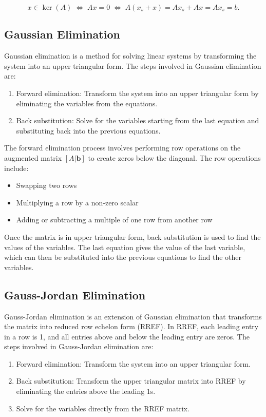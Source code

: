 \[
	x \in \ker(A) \;\Leftrightarrow\; Ax = 0 \;\Leftrightarrow\; A(x_s + x) = Ax_s + Ax = Ax_s = b.
\]


\subsection{Gaussian Elimination}

Gaussian elimination is a method for solving linear systems by transforming the system into an upper 
triangular form. The steps involved in Gaussian elimination are:

\begin{enumerate}
	\item Forward elimination: Transform the system into an upper triangular form by eliminating the 
	      variables from the equations.
	\item Back substitution: Solve for the variables starting from the last equation and substituting 
	      back into the previous equations.
\end{enumerate}

The forward elimination process involves performing row operations on the augmented matrix 
\([A | \mathbf{b}]\) to create zeros below the diagonal. The row operations include:

\begin{itemize}
	\item Swapping two rows
	\item Multiplying a row by a non-zero scalar
	\item Adding or subtracting a multiple of one row from another row
\end{itemize}

Once the matrix is in upper triangular form, back substitution is used to find the values of the 
variables. The last equation gives the value of the last variable, which can then be substituted into 
the previous equations to find the other variables.

\subsection{Gauss-Jordan Elimination}

Gauss-Jordan elimination is an extension of Gaussian elimination that transforms the matrix into 
reduced row echelon form (RREF). In RREF, each leading entry in a row is 1, and all entries above and 
below the leading entry are zeros. The steps involved in Gauss-Jordan elimination are:

\begin{enumerate}
	\item Forward elimination: Transform the system into an upper triangular form.
	\item Back substitution: Transform the upper triangular matrix into RREF by eliminating the entries 
		  above the leading 1s.
	\item Solve for the variables directly from the RREF matrix.
\end{enumerate}

